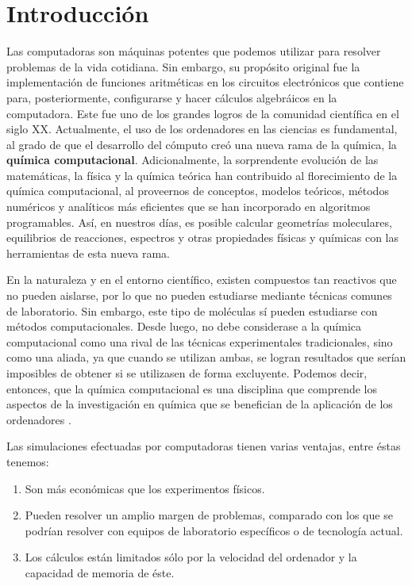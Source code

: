 \documentclass[12pt]{article}
\begin{document}
\newpage

\pagestyle{plain} 

\section*{Introducción}
Las computadoras son máquinas potentes que podemos utilizar para resolver problemas de la vida
cotidiana. Sin embargo, su propósito original fue la implementación de funciones aritméticas
en los circuitos electrónicos que contiene para, posteriormente, configurarse y hacer cálculos
algebráicos en la computadora. Este fue uno de los grandes logros de la comunidad científica en el siglo XX.
Actualmente, el uso de los ordenadores en las ciencias es fundamental, al grado de que el desarrollo
del cómputo creó una nueva rama de la química, la \textbf{química computacional}.
Adicionalmente, la sorprendente evolución de las matemáticas, la física y la química teórica han contribuido al florecimiento de la química computacional, al proveernos de conceptos, modelos
teóricos, métodos numéricos y analíticos más eficientes que se han incorporado en algoritmos
programables. Así, en nuestros días, es posible calcular geometrías moleculares, equilibrios de
reacciones, espectros y otras propiedades físicas y químicas con las herramientas de esta nueva
rama. 

En la naturaleza y en el entorno científico, existen compuestos tan reactivos que no pueden
aislarse, por lo que no pueden estudiarse mediante técnicas comunes de laboratorio. Sin embargo, este tipo de moléculas sí pueden estudiarse con métodos computacionales. Desde luego, no debe considerase a la química computacional como una rival de las técnicas experimentales tradicionales, sino como
una aliada, ya que cuando se utilizan ambas, se logran resultados que serían imposibles de obtener si se utilizasen de forma excluyente. Podemos decir, entonces, que la química computacional es una disciplina que comprende los aspectos de la investigación en química que se benefician de la aplicación de los ordenadores \cite{Cuevas2003}. 

Las simulaciones efectuadas por computadoras tienen varias ventajas, entre éstas tenemos:
\begin{enumerate}
\item Son más económicas que los experimentos físicos.
\item Pueden resolver un amplio margen de problemas, comparado con los que se podrían resolver con equipos de laboratorio específicos o de tecnología actual. 
\item Los cálculos están limitados sólo por la velocidad del ordenador y la capacidad de memoria de éste.
\end{enumerate}
\end{document}
